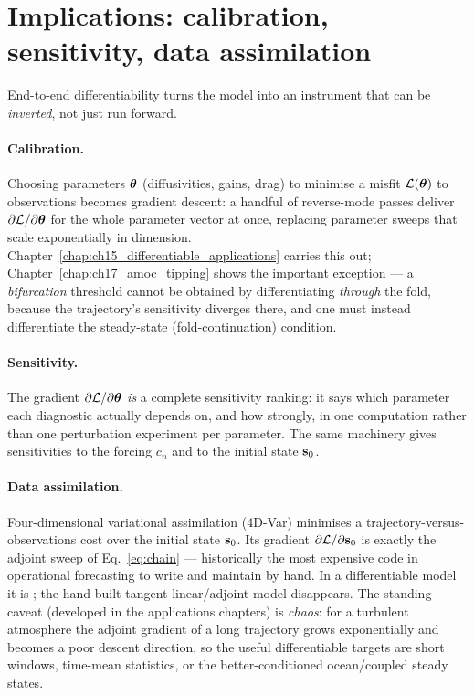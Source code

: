 \section{Implications: calibration, sensitivity, data assimilation}

End-to-end differentiability turns the model into an instrument that can be \emph{inverted}, not
just run forward.

\paragraph{Calibration.} Choosing parameters $\boldsymbol{\theta}$ (diffusivities, gains, drag) to minimise a
misfit $\mathcal{L}(\boldsymbol{\theta})$ to observations becomes gradient descent: a handful of reverse-mode passes
deliver $\partial\mathcal{L}/\partial\boldsymbol{\theta}$ for the whole parameter vector at once, replacing parameter
sweeps that scale exponentially in dimension. Chapter~\ref{chap:ch15_differentiable_applications}
carries this out; Chapter~\ref{chap:ch17_amoc_tipping} shows the important exception --- a
\emph{bifurcation} threshold cannot be obtained by differentiating \emph{through} the fold, because
the trajectory's sensitivity diverges there, and one must instead differentiate the steady-state
(fold-continuation) condition.

\paragraph{Sensitivity.} The gradient $\partial\mathcal{L}/\partial\boldsymbol{\theta}$ \emph{is} a complete
sensitivity ranking: it says which parameter each diagnostic actually depends on, and how strongly,
in one computation rather than one perturbation experiment per parameter. The same machinery gives
sensitivities to the forcing $c_n$ and to the initial state $\mathbf{s}_0$.

\paragraph{Data assimilation.} Four-dimensional variational assimilation (4D-Var) minimises a
trajectory-versus-observations cost over the initial state $\mathbf{s}_0$. Its gradient
$\partial\mathcal{L}/\partial\mathbf{s}_0$ is exactly the adjoint sweep of Eq.~\eqref{eq:chain} ---
historically the most expensive code in operational forecasting to write and maintain by hand. In a
differentiable model it is ; the hand-built tangent-linear/adjoint model disappears.
The standing caveat (developed in the applications chapters) is \emph{chaos}: for a turbulent
atmosphere the adjoint gradient of a long trajectory grows exponentially and becomes a poor
descent direction, so the useful differentiable targets are short windows, time-mean statistics, or
the better-conditioned ocean/coupled steady states.

